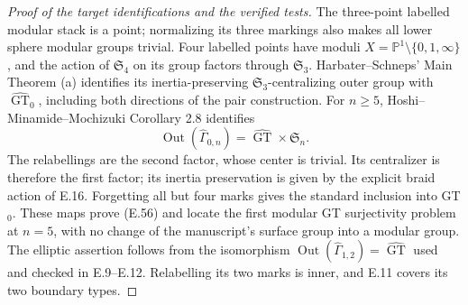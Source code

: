 \begin{proof}[Proof of the target identifications and the verified tests]
The three-point labelled modular stack is a point;
normalizing its three markings also makes all lower
sphere modular groups trivial.  Four labelled points
have moduli $X=\mathbb P^1\setminus\{0,1,\infty\}$,
and the action of $\mathfrak S_4$ on its group factors
through $\mathfrak S_3$.  Harbater--Schneps' Main
Theorem (a) identifies its inertia-preserving
$\mathfrak S_3$-centralizing outer group with
$\widehat{\operatorname{GT}}_0$, including both
directions of the pair construction.  For $n\geq5$,
Hoshi--Minamide--Mochizuki Corollary 2.8 identifies
\[
 \operatorname{Out}(\widehat\Gamma_{0,n})
       =\widehat{\operatorname{GT}}\times\mathfrak S_n.
\]
The relabellings are the second factor, whose center
is trivial.  Its centralizer is therefore the first
factor; its inertia preservation is given by the
explicit braid action of E.16.  Forgetting all but
four marks gives the standard inclusion into GT$_0$.
These maps prove (E.56) and locate the first modular
GT surjectivity problem at $n=5$, with no change of
the manuscript's surface group into a modular group.
The elliptic assertion follows from the isomorphism
$\operatorname{Out}(\widehat\Gamma_{1,2})=\widehat{\operatorname{GT}}$
used and checked in E.9--E.12.  Relabelling its two
marks is inner, and E.11 covers its two boundary types.


\end{proof}
